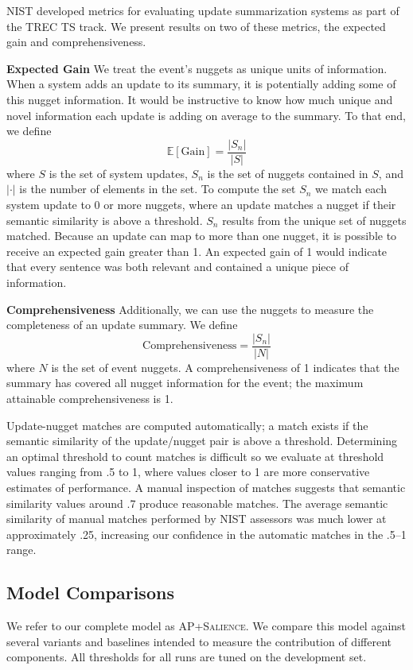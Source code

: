 NIST developed metrics for evaluating update summarization systems as part of 
the TREC TS track. We present results on two of these metrics, the expected 
gain and comprehensiveness.


\textbf{Expected Gain } We treat the event's nuggets as unique units of 
information. When a system adds an update to its summary, it is potentially 
adding some of this nugget information. It would be instructive to know how 
much unique and novel information each update is adding on average to the 
summary. To that end, we define
\[ \mathrm{\mathbb{E}[Gain]} = \frac{|S_n|}{|S|}
\] 
where $S$ is the set of system updates, $S_n$ is the set of nuggets contained 
in $S$, and $|\cdot|$ is the number of elements in the set. To compute the 
set $S_n$ we match each system update to 0 or more nuggets, where an update 
matches a nugget if their semantic similarity is above a threshold. $S_n$ 
results from the unique set of nuggets matched. Because an update can map to 
more than one nugget, it is possible to receive an expected gain greater 
than 1. An expected gain of 1 would indicate that every sentence was both 
relevant and contained a unique piece of information.


\textbf{Comprehensiveness } Additionally, we can use the nuggets to measure 
the completeness of an update summary. We define
\[ \mathrm{Comprehensiveness} = \frac{|S_n|}{|N|}\]
where $N$ is the set of event nuggets. A comprehensiveness of 1 indicates that
the summary has covered all nugget information for the event; the maximum
attainable comprehensiveness is 1.


Update-nugget matches are computed automatically; a match exists if the 
semantic similarity of the update/nugget pair is above a threshold. 
Determining an optimal threshold to count matches is difficult so we evaluate 
at threshold values ranging from .5 to 1, where values closer to 1 are more 
conservative estimates of performance. A manual inspection of matches suggests
that semantic similarity values around .7 produce reasonable matches.
The average semantic similarity of manual matches performed by NIST assessors 
was much lower at approximately .25, increasing our confidence in the 
automatic matches in the .5--1 range.


\subsection{Model Comparisons}


We refer to our complete model as \textsc{AP+Salience}.  We compare this model
against several variants and baselines intended to measure the contribution of
different components. All thresholds for all runs are tuned on the development
set.


